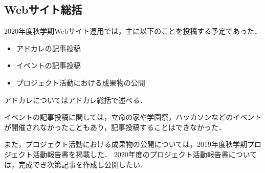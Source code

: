 \subsection*{Webサイト総括}



2020年度秋学期Webサイト運用では，主に以下のことを投稿する予定であった．

\begin{itemize}
  \item アドカレの記事投稿
  \item イベントの記事投稿
  \item プロジェクト活動における成果物の公開
\end{itemize}

アドカレについてはアドカレ総括で述べる．

イベントの記事投稿に関しては，立命の家や学園祭，ハッカソンなどのイベントが開催されなかったこともあり，記事投稿することはできなかった．

また，プロジェクト活動における成果物の公開については，2019年度秋学期プロジェクト活動報告書を掲載した．
2020年度のプロジェクト活動報告書については，完成でき次第記事を作成し公開したい．
